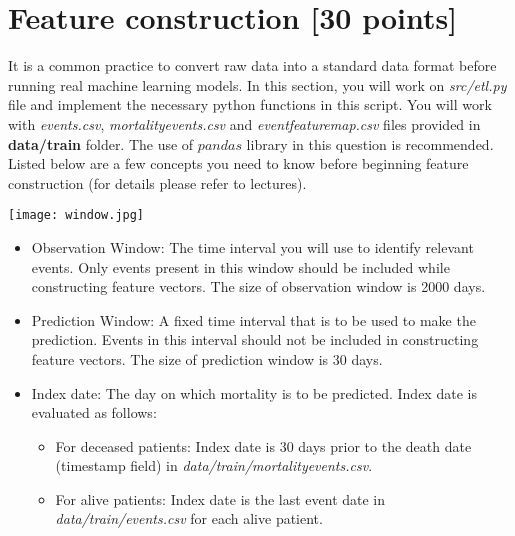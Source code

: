 \documentclass[12pt]{article}
\begin{document}
\section{Feature construction [30 points] }
It is a common practice to convert raw data into a standard data format before running real machine learning models. In this section, you will work on \textit{src/etl.py} file and implement the necessary python functions in this script. You will work with \textit{events.csv}, \textit{mortality\textunderscore events.csv} and \textit{event\textunderscore feature\textunderscore map.csv} files provided in \textbf{data/train} folder.  The use of $pandas$ library in this question is recommended. 
Listed below are a few concepts you need to know before beginning feature construction (for details please refer to lectures). 
\begin{center}
\texttt{[image: window.jpg]}
\end{center}
\begin{itemize}
\item Observation Window: The time interval you will use to identify relevant events. Only events present in this window should be included while constructing  feature vectors. The size of observation window is 2000 days. 
\item Prediction Window: A fixed time interval that is to be used to make the prediction. Events in this interval should not be included in constructing feature vectors. The size of prediction window is 30 days. 
\item Index date: The day on which mortality is to be predicted. Index date is evaluated as follows:
\begin{itemize}
\item For deceased patients: Index date is 30 days prior to the death date (timestamp field) in \textit{data/train/mortality\textunderscore events.csv}. 
\item For alive patients: Index date is the last event date in \textit{data/train/events.csv} for each alive patient. 
%
%
\end{itemize}
\end{itemize}
\end{document}
